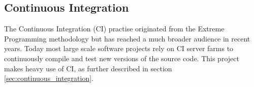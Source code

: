 
\subsection{Continuous Integration}

The Continuous Integration (CI) practise originated from the Extreme Programming methodology \cite{extreme_programming} but has reached a much broader audience in recent years. Today most large scale software projects rely on CI server farms to continuously compile and test new versions of the source code. This project makes heavy use of CI, as further described in section \ref{sec:continuous_integration}.
